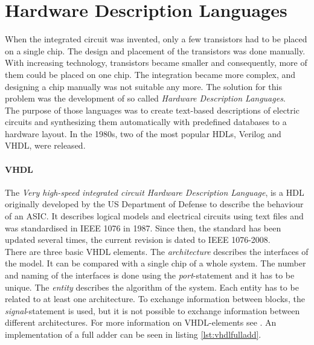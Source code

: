 \chapter{Hardware Description Languages}
\label{kap:HDL}
When the integrated circuit was invented, only a few transistors had to be placed on a single chip. The design and placement of the transistors was done manually. With increasing technology, transistors became smaller and consequently, more of them could be placed on one chip. The integration became more complex, and designing a chip manually was not suitable any more. The solution for this problem was the development of so called \textit{Hardware Description Languages}.\\
The purpose of those languages was to create text-based descriptions of electric circuits and synthesizing them automatically with predefined databases to a hardware layout. In the 1980s, two of the most popular HDLs, Verilog and VHDL, were released.
\subsubsection{VHDL}
The \textit{Very high-speed integrated circuit Hardware Description Language}, is a HDL originally developed by the US Department of Defense to describe the behaviour of an ASIC. It describes logical models and electrical circuits using text files and was standardised in IEEE 1076 in 1987. Since then, the standard has been updated several times, the current revision is dated to IEEE 1076-2008.\cite{Har13}\\
There are three basic VHDL elements. The \textit{architecture} describes the interfaces of the model. It can be compared with a single chip of a whole system. The number and naming of the interfaces is done using the \textit{port}-statement and it has to be unique. The \textit{entity} describes the algorithm of the system. Each entity has to be related to at least one architecture. To exchange information between blocks, the \textit{signal}-statement is used, but it is not possible to exchange information between different architectures. For more information on VHDL-elements see \cite{JuergenReichardt2013}. An implementation of a full adder can be seen in listing \ref{lst:vhdlfulladd}.

\lstset{language=VHDL, tabsize=4}
\begin{center}
\end{center}


